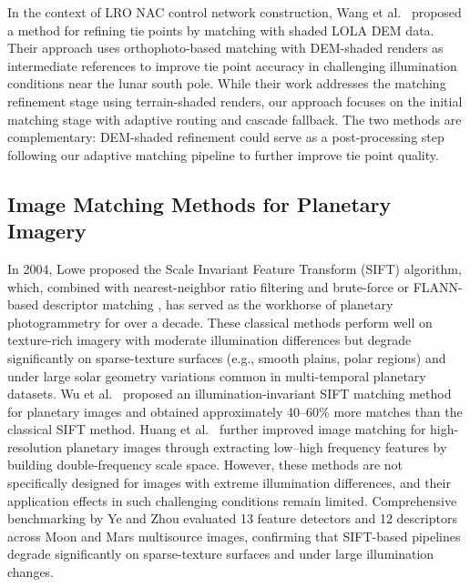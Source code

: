 \documentclass[lettersize,journal]{IEEEtran}
\begin{document}
In the context of LRO NAC control network construction, Wang et al.\ \cite{wang2025controlnet} proposed a method for refining tie points by matching with shaded LOLA DEM data. Their approach uses orthophoto-based matching with DEM-shaded renders as intermediate references to improve tie point accuracy in challenging illumination conditions near the lunar south pole. While their work addresses the matching refinement stage using terrain-shaded renders, our approach focuses on the initial matching stage with adaptive routing and cascade fallback. The two methods are complementary: DEM-shaded refinement could serve as a post-processing step following our adaptive matching pipeline to further improve tie point quality.

\subsection{Image Matching Methods for Planetary Imagery}

In 2004, Lowe \cite{lowe2004sift} proposed the Scale Invariant Feature Transform (SIFT) algorithm, which, combined with nearest-neighbor ratio filtering \cite{lowe1999ratio} and brute-force or FLANN-based descriptor matching \cite{muja2009flann}, has served as the workhorse of planetary photogrammetry for over a decade. These classical methods perform well on texture-rich imagery with moderate illumination differences but degrade significantly on sparse-texture surfaces (e.g., smooth plains, polar regions) and under large solar geometry variations common in multi-temporal planetary datasets. Wu et al.\ \cite{wu2015illumination} proposed an illumination-invariant SIFT matching method for planetary images and obtained approximately 40--60\% more matches than the classical SIFT method. Huang et al.\ \cite{huang2020matching} further improved image matching for high-resolution planetary images through extracting low--high frequency features by building double-frequency scale space. However, these methods are not specifically designed for images with extreme illumination differences, and their application effects in such challenging conditions remain limited. Comprehensive benchmarking by Ye and Zhou \cite{ye2024planetary} evaluated 13 feature detectors and 12 descriptors across Moon and Mars multisource images, confirming that SIFT-based pipelines degrade significantly on sparse-texture surfaces and under large illumination changes.
\end{document}
